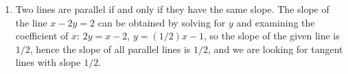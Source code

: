 \documentclass{article}
\begin{document}
\begin{enumerate}
\item \label{prob:parallel} %
  Two lines are parallel if and only if they have the same slope.  The 
  slope of the line $x-2y=2$ can be obtained by solving for $y$ and examining
  the coefficient of $x$: $2y=x-2$, $y=(1/2)x-1$, so the slope of the given
  line is $1/2$, hence the slope of all parallel lines is $1/2$, and we are
  looking for tangent lines with slope $1/2$.


\end{enumerate}
\end{document}
